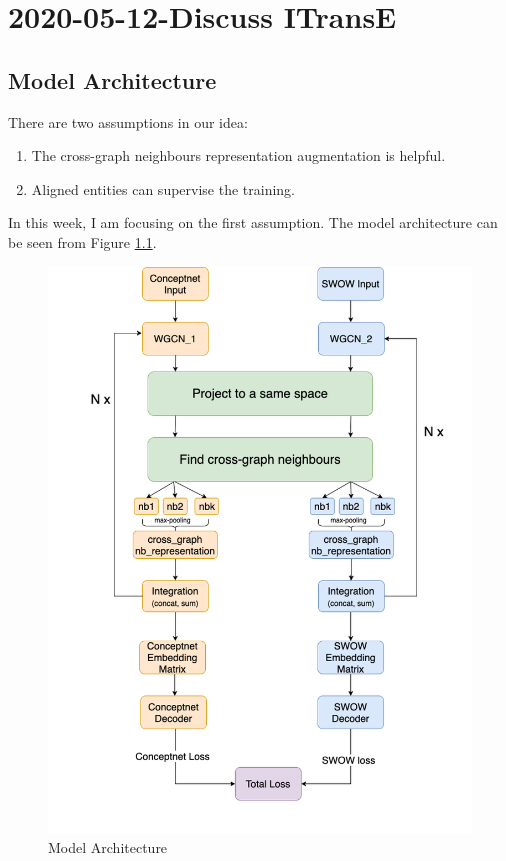\chapter{2020-05-12-Discuss ITransE}

\section{Model Architecture}
There are two assumptions in our idea: 
\begin{enumerate}
    \item The cross-graph neighbours representation augmentation is helpful.
    \item Aligned entities can supervise the training.
\end{enumerate}
In this week, I am focusing on the first assumption. The model architecture can be seen from Figure \ref{fig:model_architecture_2020_0512}. 
\begin{figure}[!ht]
    \centering
    \includegraphics[scale=0.4]{images/0512/model-architecture-2020-05-12.png}
    \caption{Model Architecture}
    \label{fig:model_architecture_2020_0512}
\end{figure}

